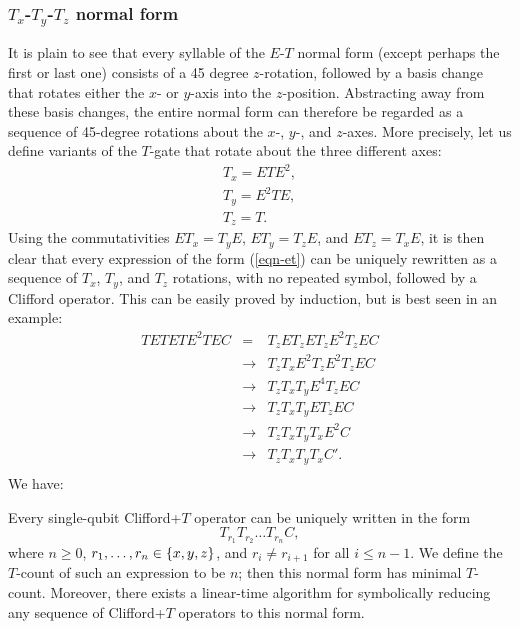 \subsubsection{$T_x$-$T_y$-$T_z$ normal form} %
\label{ssub:_t_x_t_y_t_z_normal_form}
It is plain to see that every syllable of the $E$-$T$ normal form (except perhaps the first or last
one) consists of a 45 degree $z$-rotation, followed by a basis change that rotates either the $x$-
or $y$-axis into the $z$-position. Abstracting away from these basis changes, the entire normal
form can therefore be regarded as a sequence of 45-degree rotations about the $x$-, $y$-, and
$z$-axes. More precisely, let us define variants of the $T$-gate that rotate about the three
different axes:
\[
 \begin{array}{l}
    T_x = ETE^2, \\
    T_y = E^2TE, \\
    T_z = T.
  \end{array}
\]
Using the commutativities $ET_x = T_yE$, $ET_y = T_zE$, and $ET_z = T_xE$, it is then clear that
every expression of the form (\ref{eqn-et}) can be uniquely rewritten as a sequence of $T_x$,
$T_y$, and $T_z$ rotations, with no repeated symbol, followed by a Clifford operator. This can be
easily proved by induction, but is best seen in an example:
\[
  \begin{array}{rcl}
    TETETE^2TEC
    &=& T_zET_zET_zE^2T_zEC \\
    &\rightarrow& T_zT_xE^2T_zE^2T_zEC \\
    &\rightarrow& T_zT_xT_yE^4T_zEC \\
    &\rightarrow& T_zT_xT_yET_zEC \\
    &\rightarrow& T_zT_xT_yT_xE^2C \\
    &\rightarrow& T_zT_xT_yT_xC'. \\
  \end{array}
\]
We have:
\begin{proposition}
  Every single-qubit Clifford+$T$ operator can be uniquely written in the form
  \[
    T_{r_1}T_{r_2}\ldots T_{r_n} C,
  \]
  where $n\geq 0$, $r_1,\ldots,r_n\in\{x,y,z\}$, and $r_i\neq r_{i+1}$ for all $i\leq n-1$. We
  define the $T$-count of such an expression to be $n$; then this normal form has minimal
  $T$-count. Moreover, there exists a linear-time algorithm for symbolically reducing any sequence
  of Clifford+$T$ operators to this normal form.
\end{proposition}

